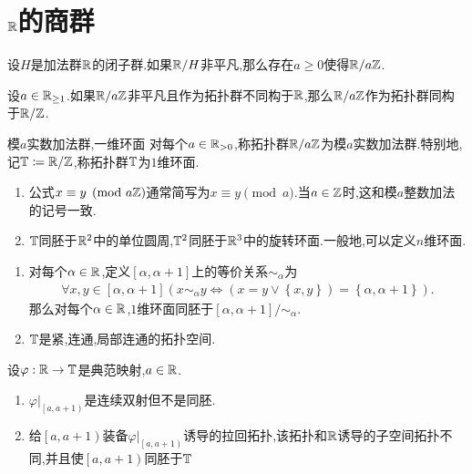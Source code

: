 \section{\texorpdfstring{$\mathbb{R}$}{R}的商群}

\begin{proposition}{}{}
	设$H$是加法群$\mathbb{R}$的闭子群.如果$\mathbb{R}/H$非平凡,那么存在$a\geq 0$使得$\mathbb{R}/a\mathbb{Z}$.
\end{proposition}

\begin{proposition}{}{}
	设$a\in\mathbb{R}_{\geq 1}$.如果$\mathbb{R}/a\mathbb{Z}$非平凡且作为拓扑群不同构于$\mathbb{R}$,那么$\mathbb{R}/a\mathbb{Z}$作为拓扑群同构于$\mathbb{R}/\mathbb{Z}$.
\end{proposition}

\begin{definition}{模$a$实数加法群,一维环面}{}
	对每个$a\in\mathbb{R}_{>0}$,称拓扑群$\mathbb{R}/a\mathbb{Z}$为模$a$实数加法群.特别地,记$\mathbb{T}\coloneq\mathbb{R}/\mathbb{Z}$,称拓扑群$\mathbb{T}$为$1$维环面.
\end{definition}

\begin{remark}{}{}
	\begin{enumerate}
		\item 公式$x\equiv y\pmod{a\mathbb{Z}}$通常简写为$x\equiv y\pmod{a}$.当$a\in\mathbb{Z}$时,这和模$a$整数加法的记号一致.
		\item $\mathbb{T}$同胚于$\mathbb{R}^{2}$中的单位圆周,$\mathbb{T}^{2}$同胚于$\mathbb{R}^{3}$中的旋转环面.一般地,可以定义$n$维环面.
	\end{enumerate}
\end{remark}

\begin{proposition}{}{}
	\begin{enumerate}
		\item 对每个$\alpha\in\mathbb{R}$,定义$\left[\alpha,\alpha+1\right]$上的等价关系$\sim_{\alpha}$为
		\begin{align*}
			\forall x,y\in\left[\alpha,\alpha+1\right]\left(x\sim_{\alpha}y\iff\left(x=y\vee\left\{x,y\right\}\right)=\left\{\alpha,\alpha+1\right\}\right).
		\end{align*}
		那么对每个$\alpha\in\mathbb{R}$,$1$维环面同胚于$\left[\alpha,\alpha+1\right]/\sim_{\alpha}$.
		\item $\mathbb{T}$是紧,连通,局部连通的拓扑空间.
	\end{enumerate}
\end{proposition}

\begin{remark}{}{}
	设$\varphi:\mathbb{R}\to\mathbb{T}$是典范映射,$a\in\mathbb{R}$.
	\begin{enumerate}
		\item $\varphi|_{\left[a,a+1\right)}$是连续双射但不是同胚.
		\item 给$\left[a,a+1\right)$装备$\varphi|_{\left[a,a+1\right)}$诱导的拉回拓扑,该拓扑和$\mathbb{R}$诱导的子空间拓扑不同,并且使$\left[a,a+1\right)$同胚于$\mathbb{T}$
	\end{enumerate}
\end{remark}